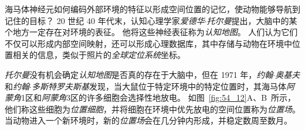 海马体神经元如何编码外部环境的特征以形成空间位置的记忆，使动物能够导航到记住的目标？
20 世纪 40 年代末，认知心理学家\textit{爱德华$\cdot$托尔曼}提出，大脑中的某个地方一定存在对环境的表征。
他将这些神经表征称为\textit{认知地图}。
人们认为它们不仅可以形成内部空间映射，还可以形成心理数据库，其中存储与动物在环境中位置相关的信息，类似于照片的\textit{全球定位系统}坐标。


\textit{托尔曼}没有机会确定\textit{认知地图}是否真的存在于大脑中，但在 1971 年，\textit{约翰$\cdot$奥基夫}和\textit{约翰$\cdot$多斯特罗夫斯基}发现，当大鼠位于特定环境中的特定位置时，其海马体\textit{阿蒙角}1区和\textit{阿蒙角}3区的许多细胞会选择性地放电\cite{o1971hippocampus}。
如图~\ref{fig:54_12}A、B~所示，他们称这些细胞为\textit{位置细胞}，并将细胞在环境中优先放电的空间位置称为\textit{位置场}。
当动物进入一个新环境时，新的\textit{位置场}会在几分钟内形成，并稳定数周至数月。


